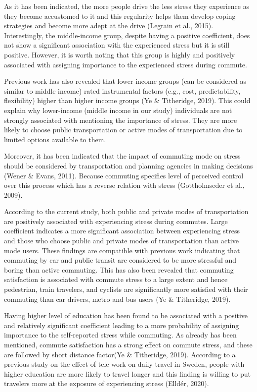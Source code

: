 \documentclass[
11pt, %
oneside, %
english, %
singlespacing, %
]{macthesis} %
\begin{document}
As it has been indicated, the more people drive the less stress they experience as they become accustomed to it and this regularity helps them develop coping strategies and become more adept at the drive (Legrain et al., 2015). Interestingly, the middle-income group, despite having a positive coefficient, does not show a significant association with the experienced stress but it is still positive. However, it is worth noting that this group is highly and positively associated with assigning importance to the experienced stress during commute.

Previous work has also revealed that lower-income groups (can be considered as similar to middle income) rated instrumental factors (e.g., cost, predictability, flexibility) higher than higher income groups (Ye \& Titheridge, 2019). This could explain why lower-income (middle income in our study) individuals are not strongly associated with mentioning the importance of stress. They are more likely to choose public transportation or active modes of transportation due to limited options available to them.

Moreover, it has been indicated that the impact of commuting mode on stress should be considered by transportation and planning agencies in making decisions (Wener \& Evans, 2011). Because commuting specifies level of perceived control over this process which has a reverse relation with stress (Gottholmseder et al., 2009).

According to the current study, both public and private modes of transportation are positively associated with experiencing stress during commutes. Large coefficient indicates a more significant association between experiencing stress and those who choose public and private modes of transportation than active mode users. These findings are compatible with previous work indicating that commuting by car and public transit are considered to be more stressful and boring than active commuting. This has also been revealed that commuting satisfaction is associated with commute stress to a large extent and hence pedestrian, train travelers, and cyclists are significantly more satisfied with their commuting than car drivers, metro and bus users (Ye \& Titheridge, 2019).

Having higher level of education has been found to be associated with a positive and relatively significant coefficient leading to a more probability of assigning importance to the self-reported stress while commuting. As already has been mentioned, commute satisfaction has a strong effect on commute stress, and these are followed by short distance factor(Ye \& Titheridge, 2019). According to a previous study on the effect of tele-work on daily travel in Sweden, people with higher education are more likely to travel longer and this finding is willing to put travelers more at the exposure of experiencing stress (Elldér, 2020).
\end{document}
